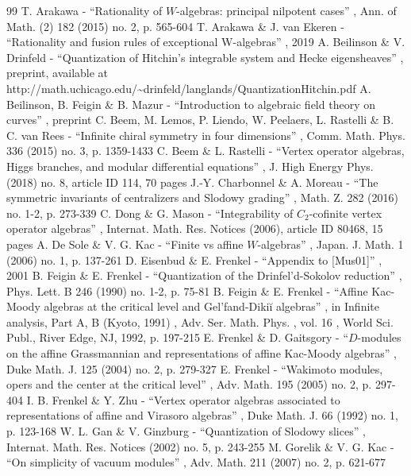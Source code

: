 \documentclass[11pt]{article}
\numberwithin{equation}{section}
\begin{document}
\begin{thebibliography}{99}
 T. Arakawa - “Rationality of $W$-algebras: principal nilpotent cases” , Ann. of Math. (2) 182 (2015) no. 2, p. 565-604
 T. Arakawa \& J. van Ekeren - “Rationality and fusion rules of exceptional W-algebras” , 2019
 A. Beilinson \& V. Drinfeld - “Quantization of Hitchin’s integrable system and Hecke eigensheaves” , preprint, available at http://math.uchicago.edu/\textasciitilde{}drinfeld/langlands/QuantizationHitchin.pdf
 A. Beilinson, B. Feigin \& B. Mazur - “Introduction to algebraic field theory on curves” , preprint
 C. Beem, M. Lemos, P. Liendo, W. Peelaers, L. Rastelli \& B. C. van Rees - “Infinite chiral symmetry in four dimensions” , Comm. Math. Phys. 336 (2015) no. 3, p. 1359-1433
 C. Beem \& L. Rastelli - “Vertex operator algebras, Higgs branches, and modular differential equations” , J. High Energy Phys. (2018) no. 8, article ID 114, 70 pages
 J.-Y. Charbonnel \& A. Moreau - “The symmetric invariants of centralizers and Slodowy grading” , Math. Z. 282 (2016) no. 1-2, p. 273-339
 C. Dong \& G. Mason - “Integrability of $C_2$-cofinite vertex operator algebras” , Internat. Math. Res. Notices (2006), article ID 80468, 15 pages
 A. De Sole \& V. G. Kac - “Finite vs affine $W$-algebras” , Japan. J. Math. 1 (2006) no. 1, p. 137-261
 D. Eisenbud \& E. Frenkel - “Appendix to [Mus01]” , 2001
 B. Feigin \& E. Frenkel - “Quantization of the Drinfel’d-Sokolov reduction” , Phys. Lett. B 246 (1990) no. 1-2, p. 75-81
 B. Feigin \& E. Frenkel - “Affine Kac-Moody algebras at the critical level and Gel’fand-Dikiĭ algebras” , in Infinite analysis, Part A, B (Kyoto, 1991) , Adv. Ser. Math. Phys. , vol. 16 , World Sci. Publ., River Edge, NJ, 1992, p. 197-215
 E. Frenkel \& D. Gaitsgory - “$D$-modules on the affine Grassmannian and representations of affine Kac-Moody algebras” , Duke Math. J. 125 (2004) no. 2, p. 279-327
 E. Frenkel - “Wakimoto modules, opers and the center at the critical level” , Adv. Math. 195 (2005) no. 2, p. 297-404
 I. B. Frenkel \& Y. Zhu - “Vertex operator algebras associated to representations of affine and Virasoro algebras” , Duke Math. J. 66 (1992) no. 1, p. 123-168
 W. L. Gan \& V. Ginzburg - “Quantization of Slodowy slices” , Internat. Math. Res. Notices (2002) no. 5, p. 243-255
 M. Gorelik \& V. G. Kac - “On simplicity of vacuum modules” , Adv. Math. 211 (2007) no. 2, p. 621-677

\end{thebibliography}
\end{document}
